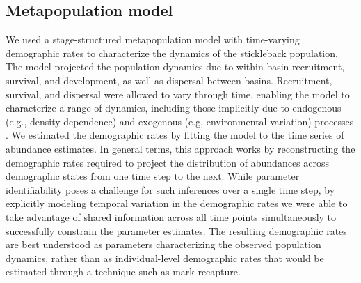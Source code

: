 \subsection*{Metapopulation model} 

We used a stage-structured metapopulation model \citep{caswell2001matrix}
with time-varying demographic rates
to characterize the dynamics of the stickleback population.
The model projected the population dynamics due to
within-basin recruitment, survival, and development,
as well as dispersal between basins.
Recruitment, survival, and dispersal were allowed to vary through time,
enabling the model to characterize a range of dynamics,
including those implicitly due to endogenous (e.g., density dependence)
and exogenous (e.g, environmental variation) processes
\citep{zeng1998, ives2012}.
We estimated the demographic rates by
fitting the model to the time series of abundance estimates.
In general terms, this approach works by reconstructing the demographic rates required
to project the distribution of abundances across demographic states
from one time step to the next.
While parameter identifiability poses a challenge for such inferences over a single time
step, by explicitly modeling temporal variation in the demographic rates we were able
to take advantage of shared information across all time points simultaneously to
successfully constrain the parameter estimates.
The resulting demographic rates are best understood as parameters
characterizing the observed population dynamics,
rather than as individual-level demographic rates that would be estimated through a
technique such as mark-recapture.

